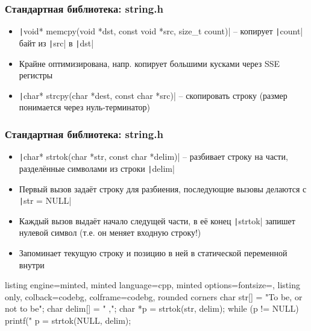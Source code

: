 \documentclass[10pt]{beamer}
\begin{document}
\begin{frame}[fragile]
\frametitle{Стандартная библиотека: string.h}
\begin{itemize}
\item \texttt|void* memcpy(void *dst, const void *src, size_t count)| -- копирует \texttt|count| байт из \texttt|src| в \texttt|dst|
\pause
\item Крайне оптимизирована, напр. копирует большими кусками через SSE регистры
\pause
\item \texttt|char* strcpy(char *dest, const char *src)| -- скопировать строку (размер понимается через нуль-терминатор)
\end{itemize}
\end{frame}

\begin{frame}[fragile]
\frametitle{Стандартная библиотека: string.h}
\begin{itemize}
\item \texttt|char* strtok(char *str, const char *delim)| -- разбивает строку на части, разделённые символами из строки \texttt|delim|
\pause
\item Первый вызов задаёт строку для разбиения, последующие вызовы делаются с \texttt|str = NULL|
\pause
\item Каждый вызов выдаёт начало следущей части, в её конец \texttt|strtok| запишет нулевой символ (т.е. он меняет входную строку!)
\pause
\item Запоминает текущую строку и позицию в ней в статической переменной внутри
\end{itemize}
\pause
{}
\begin{tcblisting}{listing engine=minted, minted language=cpp, minted options={fontsize=\scriptsize}, listing only, colback=codebg, colframe=codebg, rounded corners}
char str[] = "To be, or not to be";
char delim[] = " ,";
char *p = strtok(str, delim);
while (p != NULL) {
  printf("%
  p = strtok(NULL, delim);
}
\end{tcblisting}
\end{frame}
\end{document}
